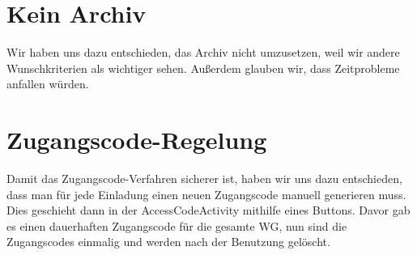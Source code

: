 \section{Kein Archiv}
Wir haben uns dazu entschieden, das Archiv nicht umzusetzen, weil wir andere Wunschkriterien als wichtiger sehen. Außerdem glauben wir, dass Zeitprobleme anfallen würden.

\section{Zugangscode-Regelung}
Damit das Zugangscode-Verfahren sicherer ist, haben wir uns dazu entschieden, dass man für jede Einladung einen neuen Zugangscode manuell generieren muss. Dies geschieht dann in der AccessCodeActivity mithilfe eines Buttons. Davor gab es einen dauerhaften Zugangscode für die gesamte WG, nun sind die Zugangscodes einmalig und werden nach der Benutzung  gelöscht. 